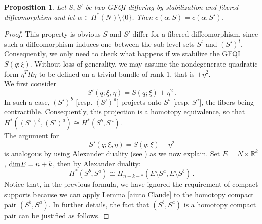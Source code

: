 \documentclass{article}
\newcommand{\1}{\mathbbm{1}}
\newtheorem{prp}[thm]{Proposition}
\theoremstyle{remark}
\begin{document}
{{\begin{prp} \label{invariance 2 op} Let $S,S'$ be two GFQI differing by stabilization and fibered diffeomorphism and  let $\alpha\in H^*(N) \setminus \{0\}$. Then $c(\alpha, S)=c(\alpha, S')$. 
\end{prp}
\begin{proof}
\noindent This property is obvious 
$S$ and $S'$ differ for a fibered diffeomorphism, since such a diffeomorphism induces one between the sub-level sets $S^t$ and $(S')^t$. \\
\noindent Consequently, we only need to check what happens if we stabilize the GFQI $S(q;\xi)$. Without loss of generality, we may assume the nondegenerate quadratic form $\eta^T R \eta$ to be defined on a trivial bundle of rank $1$, that is $\pm \eta^2$. \\
We first consider
$$S'(q;\xi,\eta) = S(q;\xi) + \eta^2\, .$$
In such a case, $(S')^b$ [resp. $(S')^a$] projects onto $S^b$ [resp. $S^a$], the fibers being contractible. Consequently, this projection is a homotopy equivalence, so that
$H^*((S')^b, (S')^a)\cong H^*(S^b, S^a)$. \\
The argument for
$$S'(q;\xi,\eta) = S(q;\xi) - \eta^2$$
is analogous by using Alexander duality (see \cite[Theorem 16 at page 296]{spa95}) as we now explain. Set $E = N \times \mathbb{R}^k$, $\textnormal{dim}E = n+k$, then by Alexander duality:
$$H^*(S^b,S^a) \cong H_{n+k-*} (E \setminus S^a, E \setminus S^b)\, .$$
Notice that, in the previous formula, we have ignored the requirement of compact supports because we can apply Lemma \ref{aiuto Claude} to the homotopy compact pair $(S^b,S^a)$. In further details, the fact that $(S^b,S^a)$ is a homotopy compact pair can be justified as follows. 


\end{proof}}}
\end{document}
